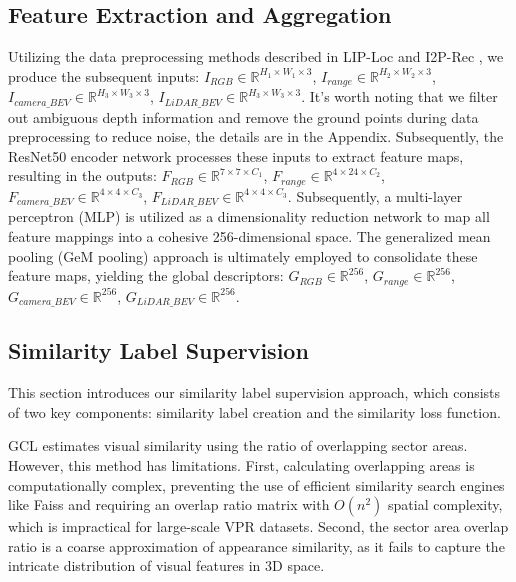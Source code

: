 \subsection{Feature Extraction and Aggregation}
Utilizing the data preprocessing methods described in LIP-Loc \cite{shubodh2024lip} and I2P-Rec \cite{shubodh2024lip}, we produce the subsequent inputs: $I_{RGB} \in \mathbb{R}^{H_1{\times}W_1{\times}3}$, $I_{range} \in \mathbb{R}^{H_2{\times}W_2{\times}3}$, $I_{camera\_BEV} \in \mathbb{R}^{H_3{\times}W_3{\times}3}$, $I_{LiDAR\_BEV} \in \mathbb{R}^{H_3{\times}W_3{\times}3}$. It's worth noting that we filter out ambiguous depth information and remove the ground points during data preprocessing to reduce noise, the details are in the Appendix. Subsequently, the ResNet50 encoder network processes these inputs to extract feature maps, resulting in the outputs: $F_{RGB} \in \mathbb{R}^{7{\times}7{\times}C_1}$, $F_{range} \in \mathbb{R}^{4{\times}24{\times}C_2}$, $F_{camera\_BEV} \in \mathbb{R}^{4{\times}4{\times}C_3}$, $F_{LiDAR\_BEV} \in \mathbb{R}^{4{\times}4{\times}C_3}$. Subsequently, a multi-layer perceptron (MLP) is utilized as a dimensionality reduction network to map all feature mappings into a cohesive 256-dimensional space. The generalized mean pooling (GeM pooling) approach is ultimately employed to consolidate these feature maps, yielding the global descriptors: $G_{RGB} \in \mathbb{R}^{256}$, $G_{range} \in \mathbb{R}^{256}$, $G_{camera\_BEV} \in \mathbb{R}^{256}$, $G_{LiDAR\_BEV} \in \mathbb{R}^{256}$.

\subsection{Similarity Label Supervision}
This section introduces our similarity label supervision approach, which consists of two key components: similarity label creation and the similarity loss function.

GCL \cite{leyva2023data} estimates visual similarity using the ratio of overlapping sector areas. However, this method has limitations. First, calculating overlapping areas is computationally complex, preventing the use of efficient similarity search engines like Faiss \cite{douze2024faiss} and requiring an overlap ratio matrix with $O(n^2)$ spatial complexity, which is impractical for large-scale VPR datasets. Second, the sector area overlap ratio is a coarse approximation of appearance similarity, as it fails to capture the intricate distribution of visual features in 3D space.
 
